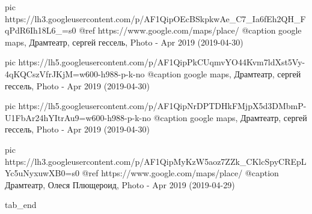      pic https://lh3.googleusercontent.com/p/AF1QipOEcBSkpkwAe_C7_Ia6fEh2QH_FqPdR6Ih18L6_=s0
     @ref https://www.google.com/maps/place/%
     @caption google maps, Драмтеатр, сергей гессель, Photo - Apr 2019 (2019-04-30)


     pic https://lh5.googleusercontent.com/p/AF1QipPkCUqmvYO44Kvm7ldXst5Vy-4qKQCszVfrJKjM=w600-h988-p-k-no
     @caption google maps, Драмтеатр, сергей гессель, Photo - Apr 2019 (2019-04-30)

     pic https://lh5.googleusercontent.com/p/AF1QipNrDPTDHkFMjpX5d3DMbmP-U1FbAr24hYItrAu9=w600-h988-p-k-no
     @caption google maps, Драмтеатр, сергей гессель, Photo - Apr 2019 (2019-04-30)

     pic https://lh3.googleusercontent.com/p/AF1QipMyKzW5aoz7ZZk_CKlcSpyCREpLYc5uNyxuwXB0=s0
     @ref https://www.google.com/maps/place/%
     @caption Драмтеатр, Олеся Плющероид, Photo - Apr 2019 (2019-04-29)

  tab_end
\fi
